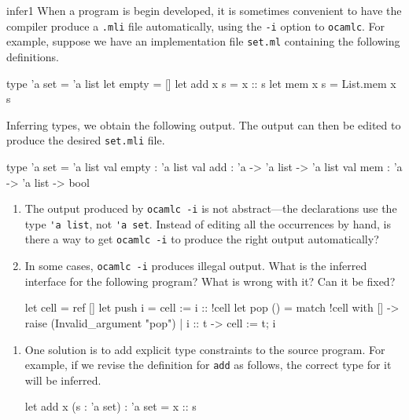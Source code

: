 %
\begin{exercise}{infer1}
When a program is begin developed, it is sometimes convenient to have the
compiler produce a \hbox{\lstinline+.mli+} file automatically, using
the \hbox{\lstinline+-i+} option to \hbox{\lstinline+ocamlc+}.  For
example, suppose we have an implementation
file \hbox{\lstinline+set.ml+} containing the following definitions.

\begin{ocaml}
type 'a set = 'a list
let empty = []
let add x s = x :: s
let mem x s = List.mem x s
\end{ocaml}
%
Inferring types, we obtain the following output.  The output can then
be edited to produce the desired \hbox{\lstinline+set.mli+} file.
\begin{ocaml}
type 'a set = 'a list
val empty : 'a list
val add : 'a -> 'a list -> 'a list
val mem : 'a -> 'a list -> bool
\end{ocaml}

\begin{enumerate}
\item

The output produced by \hbox{\lstinline+ocamlc -i+} is not abstract---the
declarations use the type
%
\hbox{\lstinline+'a list+},
%
not \hbox{\lstinline+'a set+}.  Instead of editing all the occurrences by hand, is
there a way to get \hbox{\lstinline+ocamlc -i+} to produce the right output
automatically?

\item

In some cases, \hbox{\lstinline+ocamlc -i+} produces illegal output.
What is the inferred interface for the following program?  What is
wrong with it?  Can it be fixed?

\begin{ocaml}
let cell = ref []
let push i = cell := i :: !cell
let pop () =
   match !cell with
      [] -> raise (Invalid_argument "pop")
    | i :: t ->
        cell := t;
        i
\end{ocaml}
\end{enumerate}

\begin{answer}\ifanswers
\begin{enumerate}
\item

One solution is to add explicit type constraints to the source
program.  For example, if we revise the definition
for \hbox{\lstinline+add+} as follows, the correct type for it will be
inferred.
\begin{ocaml}
let add x (s : 'a set) : 'a set = x :: s
\end{ocaml}


\end{enumerate}
\end{answer}
\end{exercise}
